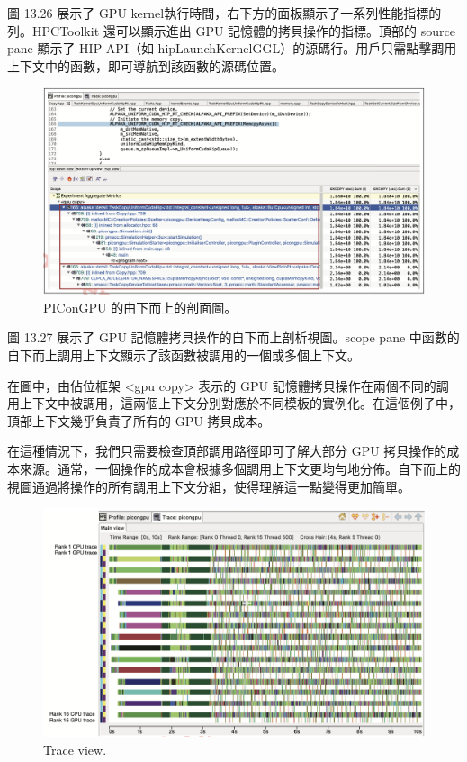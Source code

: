 圖 13.26 展示了 GPU kernel執行時間，右下方的面板顯示了一系列性能指標的列。HPCToolkit 還可以顯示進出 GPU 記憶體的拷貝操作的指標。頂部的 source pane 顯示了 HIP API（如 hipLaunchKernelGGL）的源碼行。用戶只需點擊調用上下文中的函數，即可導航到該函數的源碼位置。


\begin{figure}
    \centering
    \includegraphics[width=0.9\linewidth]{FileAusiliari/Screenshots/Figure13-27.png}
    \caption{PIConGPU 的由下而上的剖面圖。}
    \label{fig:PAPI27}
\end{figure}
圖 13.27 展示了 GPU 記憶體拷貝操作的自下而上剖析視圖。scope pane 中函數的自下而上調用上下文顯示了該函數被調用的一個或多個上下文。

在圖中，由佔位框架 <gpu copy> 表示的 GPU 記憶體拷貝操作在兩個不同的調用上下文中被調用，這兩個上下文分別對應於不同模板的實例化。在這個例子中，頂部上下文幾乎負責了所有的 GPU 拷貝成本。

在這種情況下，我們只需要檢查頂部調用路徑即可了解大部分 GPU 拷貝操作的成本來源。通常，一個操作的成本會根據多個調用上下文更均勻地分佈。自下而上的視圖通過將操作的所有調用上下文分組，使得理解這一點變得更加簡單。

\begin{figure}
    \centering
    \includegraphics[width=0.9\linewidth]{FileAusiliari/Screenshots/Figure13-28.png}
    \caption{Trace view.}
    \label{fig:PAPI28}
\end{figure}

